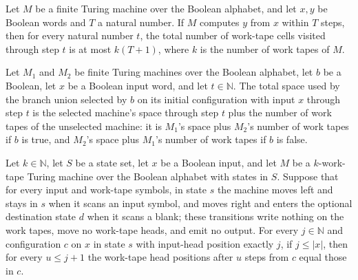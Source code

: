\begin{theorem}
\label{Turing.FinTM.ComputesInTime.spaceUsed_le}
\leanok
{}
Let $M$ be a finite Turing machine over the Boolean alphabet, and let $x,y$ be Boolean
words and $T$ a natural number. If $M$ computes $y$ from $x$ within $T$ steps, then for
every natural number $t$, the total number of work-tape cells visited through step $t$
is at most $k(T+1)$, where $k$ is the number of work tapes of $M$.
\end{theorem}

\begin{theorem}
\label{Turing.FinTM.branchTM_spaceUsed}
\leanok
{}
Let $M_1$ and $M_2$ be finite Turing machines over the Boolean alphabet, let $b$ be a
Boolean, let $x$ be a Boolean input word, and let $t\in\mathbb{N}$. The total space used
by the branch union selected by $b$ on its initial configuration with input $x$ through
step $t$ is the selected machine's space through step $t$ plus the number of work tapes
of the unselected machine: it is $M_1$'s space plus $M_2$'s number of work tapes if $b$
is true, and $M_2$'s space plus $M_1$'s number of work tapes if $b$ is false.
\end{theorem}

\begin{theorem}
\label{Turing.FinTM.rewind_scan_heads}
\leanok
{}
Let $k \in \mathbb{N}$, let $S$ be a state set, let $x$ be a Boolean input, and let $M$
be a $k$-work-tape Turing machine over the Boolean alphabet with states in $S$. Suppose
that for every input and work-tape symbols, in state $s$ the machine moves left and
stays in $s$ when it scans an input symbol, and moves right and enters the optional
destination state $d$ when it scans a blank; these transitions write nothing on the work
tapes, move no work-tape heads, and emit no output. For every $j \in \mathbb{N}$ and
configuration $c$ on $x$ in state $s$ with input-head position exactly $j$, if $j \le
|x|$, then for every $u \le j+1$ the work-tape head positions after $u$ steps from $c$
equal those in $c$.
\end{theorem}


